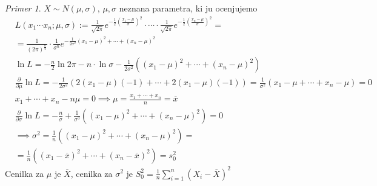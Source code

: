 \documentclass[a4paper,12pt]{article}
\theoremstyle{definition}
\theoremstyle{remark}
\newtheorem*{ex}{Primer}
\begin{document}
\begin{ex}
    $X \sim N(\mu, \sigma)$, $\mu, \sigma$ neznana parametra, ki ju ocenjujemo
    \begin{align*}
        &L(x_1 \cdots x_n; \mu, \sigma) := \frac{1}{\sqrt{2\pi}} e^{-\frac{1}{2} (\frac{x_1-\mu}{\sigma})^2} \cdot
            \cdots \cdot \frac{1}{\sqrt{2\pi}} e^{-\frac{1}{2} (\frac{x_n-\mu}{\sigma})^2} = \\
        &= \frac{1}{(2\pi)^{\frac{n}{2}}} \cdot \frac{1}{\sigma^n} e^{-\frac{1}{2 \sigma^2}
            (x_1 - \mu)^2 + \cdots + (x_n - \mu)^2} \\
        &\ln L = -\frac{n}{2} \ln 2\pi - n \cdot \ln \sigma - \frac{1}{2 \sigma^2} ((x_1 - \mu)^2 + \cdots +
            (x_n - \mu)^2) \\
        &\frac{\partial}{\partial \mu} \ln L = -\frac{1}{2 \sigma^2} (2(x_1 - \mu)(-1) + \cdots +
            2(x_1 - \mu)(-1)) = \frac{1}{\sigma^2} (x_1 - \mu + \cdots + x_n - \mu) = 0 \\
        &x_1 + \cdots + x_n - n\mu = 0 \implies \mu = \frac{x_1 + \cdots + x_n}{n} = \overline{x} \\
        &\frac{\partial}{\partial \sigma} \ln L = -\frac{n}{\sigma} + \frac{1}{\sigma^3}
            ((x_1 - \mu)^2 + \cdots + (x_n - \mu)^2) = 0 \\
        &\implies \sigma^2 = \frac{1}{n} ((x_1 - \mu)^2 + \cdots + (x_n - \mu)^2) = \\
        &= \frac{1}{n} ((x_1 - \overline{x})^2 + \cdots + (x_n - \overline{x})^2) = s_0^2
    \end{align*}
    Cenilka za $\mu$ je $\overline{X}$, cenilka za $\sigma^2$ je $S_0^2 =
    \frac{1}{n} \sum_{i=1}^{n} (X_i - \overline{X})^2$
\end{ex}
\end{document}

